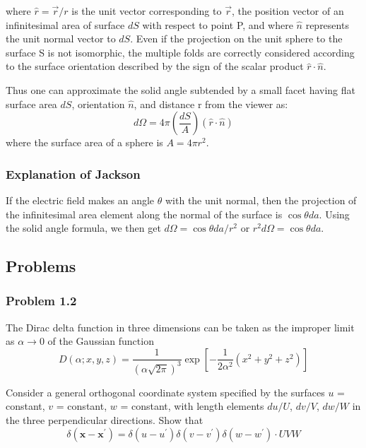 where $\hat{r} = \vec{r}/r$ is the unit vector corresponding to $\vec {r}$,
the position vector of an infinitesimal area of surface $dS$ with respect to point P,
and where $\hat{n}$ represents the unit normal vector to $dS$.
Even if the projection on the unit sphere to the surface S is not isomorphic,
the multiple folds are correctly considered according to the surface orientation
described by the sign of the scalar product $\hat{r}\cdot\hat{n}$.

Thus one can approximate the solid angle subtended by a small facet having flat surface area
$dS$, orientation $\hat{n}$, and distance r from the viewer as:
$$
d\Omega = 4\pi \left( \frac{dS}{A} \right) (\hat{r}\cdot\hat{n})
$$
where the surface area of a sphere is $A = 4\pi r^2$.


\subsubsection{Explanation of Jackson}

If the electric field makes an angle $\theta$ with the unit normal, then the projection of the
infinitesimal area element along the normal of the surface is $\cos\theta da$.
Using the solid angle formula, we then get $d\Omega = \cos\theta da / r^2$ or
$r^2 d\Omega = \cos\theta da$.



\subsection{Problems}

\subsubsection{Problem 1.2}


The Dirac delta function in three dimensions can be taken as the improper limit as $\alpha \rightarrow 0$ of the
Gaussian function
$$
D\left(\alpha ; x, y, z \right) =
    \frac{1}{\left(\alpha \sqrt{2\pi}\right)^3}
    \exp{ \left[ -\frac{1}{2\alpha^2} \left( x^2 + y^2 + z^2 \right) \right] }
$$

Consider a general orthogonal coordinate system specified by the surfaces $u$ = constant, $v$ = constant,
$w$ = constant, with length elements $du/U$, $dv/V$, $dw/W$ in the three perpendicular directions.
Show that
$$
\delta\left( \mathbf{x} - \mathbf{x}^\prime \right) =
    \delta\left(u - u^\prime\right) \delta\left(v - v^\prime\right) \delta\left(w - w^\prime\right) \cdot UVW
$$

